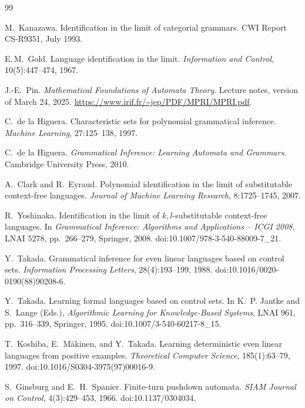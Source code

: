 \documentclass[11pt,a4paper]{article}
\theoremstyle{remark}
\theoremstyle{plain}
\begin{document}
\begin{thebibliography}{99}

M.~Kanazawa.
\newblock Identification in the limit of categorial grammars.
\newblock CWI Report CS-R9351, July 1993.


E.\,M.~Gold.
Language identification in the limit.
\textit{Information and Control}, 10(5):447--474, 1967.

J.-E.~Pin.
\newblock \emph{Mathematical Foundations of Automata Theory}.
\newblock Lecture notes, version of March 24, 2025.
\newblock \url{https://www.irif.fr/~jep/PDF/MPRI/MPRI.pdf}.

C.~de la Higuera.
Characteristic sets for polynomial grammatical inference.
\textit{Machine Learning}, 27:125--138, 1997.

C.~de la Higuera.
\textit{Grammatical Inference: Learning Automata and Grammars}.
Cambridge University Press, 2010.


A.~Clark and R.~Eyraud.
Polynomial identification in the limit of substitutable
context-free languages.
\textit{Journal of Machine Learning Research},
8:1725--1745, 2007.

R.~Yoshinaka.
Identification in the limit of $k, l$-substitutable
context-free languages.
In \textit{Grammatical Inference: Algorithms and Applications -- ICGI 2008},
LNAI 5278, pp.~266--279, Springer, 2008.
doi:10.1007/978-3-540-88009-7\_21.


Y.~Takada.
\newblock Grammatical inference for even linear languages based on control sets.
\newblock \textit{Information Processing Letters}, 28(4):193--199, 1988.
doi:10.1016/0020-0190(88)90208-6.

Y.~Takada.
\newblock Learning formal languages based on control sets.
\newblock In K.~P. Jantke and S.~Lange (Eds.), \textit{Algorithmic Learning
for Knowledge-Based Systems}, LNAI 961, pp.~316--339, Springer, 1995.
doi:10.1007/3-540-60217-8\_15.

T.~Koshiba, E.~M\"akinen, and Y.~Takada.
\newblock Learning deterministic even linear languages from positive examples.
\newblock \textit{Theoretical Computer Science}, 185(1):63--79, 1997.
doi:10.1016/S0304-3975(97)00016-9.

S.~Ginsburg and E.~H.~Spanier.
\newblock Finite-turn pushdown automata.
\newblock \textit{SIAM Journal on Control}, 4(3):429--453, 1966.
doi:10.1137/0304034.


\end{thebibliography}
\end{document}
